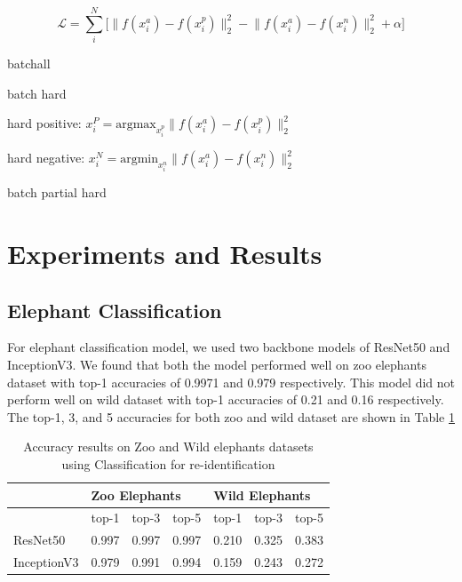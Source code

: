 \documentclass[10pt,twocolumn,letterpaper]{article}
\begin{document}
$$
\mathcal{L} = \sum_{i}^N \Big[ \lVert f(x_i^a) - f(x_i^p)\rVert_2^2 - \lVert f(x_i^a) - f(x_i^n)\rVert_2^2  + \alpha \Big]
$$

batchall

batch hard

hard positive: $x_i^P = \text{argmax}_{x_i^p}  \lVert f(x_i^a) - f(x_i^p)\rVert_2^2$

hard negative: $x_i^N = \text{argmin}_{x_i^n}  \lVert f(x_i^a) - f(x_i^n)\rVert_2^2$

batch partial hard



\section{Experiments and Results}
\label{sec:expresults} 

\subsection{Elephant Classification}

For elephant classification model, we used two backbone models of ResNet50 and InceptionV3. We found that both the model performed well on zoo elephants dataset with top-1 accuracies of 0.9971 and 0.979 respectively. This model did not perform well on wild dataset with top-1 accuracies of 0.21 and 0.16 respectively. The top-1, 3, and 5 accuracies for both zoo and wild dataset are shown in Table \ref{tab:clf-results}

\begin{table}[]
\begin{tabular}{@{}lllllll@{}}
\toprule
                                 & \multicolumn{3}{l}{Zoo Elephants}          & \multicolumn{3}{l}{Wild Elephants} \\ \midrule
\multicolumn{1}{l|}{}            & top-1 & top-3 & \multicolumn{1}{l|}{top-5} & top-1      & top-3     & top-5     \\
\multicolumn{1}{l|}{ResNet50}    & 0.997 & 0.997 & \multicolumn{1}{l|}{0.997} & 0.210      & 0.325     & 0.383     \\
\multicolumn{1}{l|}{InceptionV3} & 0.979 & 0.991 & \multicolumn{1}{l|}{0.994} & 0.159      & 0.243     & 0.272     \\ \bottomrule
\end{tabular}
\caption{Accuracy results on Zoo and Wild elephants datasets using Classification for re-identification}
\label{tab:clf-results}
\end{table}
\end{document}
